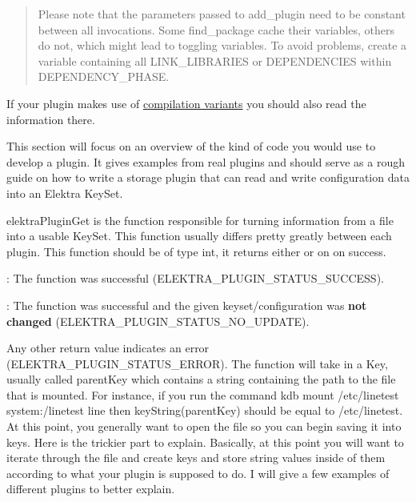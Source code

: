 \begin{quote}
Please note that the parameters passed to {\ttfamily add\+\_\+plugin} need to be constant between all invocations. Some {\ttfamily find\+\_\+package} cache their variables, others do not, which might lead to toggling variables. To avoid problems, create a variable containing all {\ttfamily L\+I\+N\+K\+\_\+\+L\+I\+B\+R\+A\+R\+I\+ES} or {\ttfamily D\+E\+P\+E\+N\+D\+E\+N\+C\+I\+ES} within {\ttfamily D\+E\+P\+E\+N\+D\+E\+N\+C\+Y\+\_\+\+P\+H\+A\+SE}. \end{quote}


If your plugin makes use of \hyperlink{doc_tutorials_compilation-variants_md}{compilation variants} you should also read the information there.

This section will focus on an overview of the kind of code you would use to develop a plugin. It gives examples from real plugins and should serve as a rough guide on how to write a storage plugin that can read and write configuration data into an Elektra {\ttfamily Key\+Set}.

{\ttfamily elektra\+Plugin\+Get} is the function responsible for turning information from a file into a usable {\ttfamily Key\+Set}. This function usually differs pretty greatly between each plugin. This function should be of type {\ttfamily int}, it returns either {} or on {} on success.


\begin{DoxyItemize}
\item {}\+: The function was successful ({\ttfamily E\+L\+E\+K\+T\+R\+A\+\_\+\+P\+L\+U\+G\+I\+N\+\_\+\+S\+T\+A\+T\+U\+S\+\_\+\+S\+U\+C\+C\+E\+SS}).
\item {}\+: The function was successful and the given keyset/configuration was {\bfseries not changed} ({\ttfamily E\+L\+E\+K\+T\+R\+A\+\_\+\+P\+L\+U\+G\+I\+N\+\_\+\+S\+T\+A\+T\+U\+S\+\_\+\+N\+O\+\_\+\+U\+P\+D\+A\+TE}).
\end{DoxyItemize}

Any other return value indicates an error ({\ttfamily E\+L\+E\+K\+T\+R\+A\+\_\+\+P\+L\+U\+G\+I\+N\+\_\+\+S\+T\+A\+T\+U\+S\+\_\+\+E\+R\+R\+OR}). The function will take in a {\ttfamily Key}, usually called {\ttfamily parent\+Key} which contains a string containing the path to the file that is mounted. For instance, if you run the command {\ttfamily kdb mount /etc/linetest system\+:/linetest line} then {\ttfamily key\+String(parent\+Key)} should be equal to {\ttfamily /etc/linetest}. At this point, you generally want to open the file so you can begin saving it into keys. Here is the trickier part to explain. Basically, at this point you will want to iterate through the file and create keys and store string values inside of them according to what your plugin is supposed to do. I will give a few examples of different plugins to better explain.

